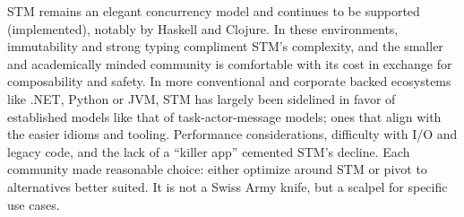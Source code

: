 STM remains an elegant concurrency model and continues to be supported (implemented), notably by Haskell and Clojure.
In these environments, immutability and strong typing compliment STM’s complexity,
and the smaller and academically minded community is comfortable with its cost
in exchange for composability and safety. In more conventional and corporate
backed ecosystems like .NET, Python or JVM, STM has largely been sidelined
in favor of established models like that of task-actor-message models;
ones that align with the easier idioms and tooling.
Performance considerations, difficulty with I/O and legacy code,
and the lack of a “killer app” cemented STM’s decline.
Each community made reasonable choice: either optimize
around STM or pivot to alternatives better suited.
It is not a Swiss Army knife, but a scalpel for specific use cases.